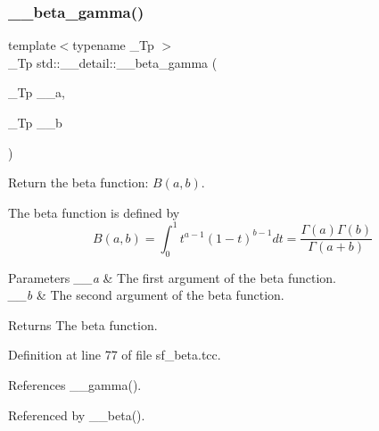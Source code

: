 \mbox{\label{namespacestd_1_1____detail_a93cfa67cc3f14564925ed3153e055cd1}} 
\subsubsection{\texorpdfstring{\+\_\+\+\_\+beta\+\_\+gamma()}{\_\_beta\_gamma()}}
{\footnotesize\ttfamily template$<$typename \+\_\+\+Tp $>$ \\
\+\_\+\+Tp std\+::\+\_\+\+\_\+detail\+::\+\_\+\+\_\+beta\+\_\+gamma (\begin{DoxyParamCaption}\item[{\+\_\+\+Tp}]{\+\_\+\+\_\+a,  }\item[{\+\_\+\+Tp}]{\+\_\+\+\_\+b }\end{DoxyParamCaption})}



Return the beta function\+: $ B(a,b) $. 

The beta function is defined by \[ B(a,b) = \int_0^1 t^{a - 1} (1 - t)^{b - 1} dt = \frac{\Gamma(a)\Gamma(b)}{\Gamma(a+b)} \]


\begin{DoxyParams}{Parameters}
{\em \+\_\+\+\_\+a} & The first argument of the beta function. \\
\hline
{\em \+\_\+\+\_\+b} & The second argument of the beta function. \\
\hline
\end{DoxyParams}
\begin{DoxyReturn}{Returns}
The beta function. 
\end{DoxyReturn}


Definition at line 77 of file sf\+\_\+beta.\+tcc.



References \+\_\+\+\_\+gamma().



Referenced by \+\_\+\+\_\+beta().

\mbox{\label{namespacestd_1_1____detail_aedfe43a9c0065cc3883df50536a625e4}} 
